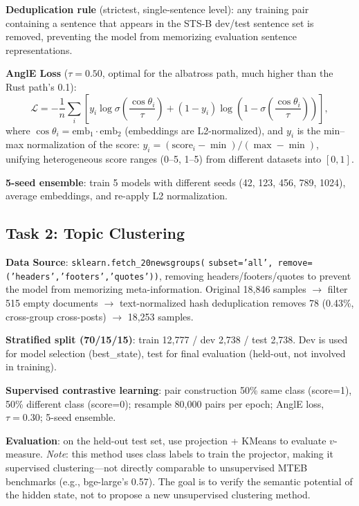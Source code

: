 \documentclass[11pt]{article}
\begin{document}
\textbf{Deduplication rule} (strictest, single-sentence level): any training
pair containing a sentence that appears in the STS-B dev/test sentence set is
removed, preventing the model from memorizing evaluation sentence
representations.

\textbf{AnglE Loss} ($\tau=0.50$, optimal for the albatross path, much higher
than the Rust path's 0.1):
\begin{equation}
\mathcal{L} = -\frac{1}{n} \sum_i \left[ y_i \log
\sigma\!\left(\frac{\cos\theta_i}{\tau}\right) + (1-y_i) \log\left(1 -
\sigma\!\left(\frac{\cos\theta_i}{\tau}\right)\right) \right],
\end{equation}
where $\cos\theta_i = \text{emb}_1 \cdot \text{emb}_2$ (embeddings are
L2-normalized), and $y_i$ is the min--max normalization of the score:
$y_i = (\text{score}_i - \min) / (\max - \min)$, unifying heterogeneous score
ranges (0--5, 1--5) from different datasets into $[0,1]$.

\textbf{5-seed ensemble}: train 5 models with different seeds (42, 123, 456,
789, 1024), average embeddings, and re-apply L2 normalization.

\subsection{Task 2: Topic Clustering}

\textbf{Data Source}:
\texttt{sklearn.fetch\_20newsgroups(}%
\allowbreak\texttt{subset='all', remove=('headers','footers','quotes'))},
removing headers/footers/quotes to prevent the model from memorizing
meta-information. Original 18,846 samples $\to$ filter 515 empty documents
$\to$ text-normalized hash deduplication removes 78 (0.43\%, cross-group
cross-posts) $\to$ 18,253 samples.

\textbf{Stratified split (70/15/15)}: train 12,777 / dev 2,738 / test 2,738.
Dev is used for model selection (best\_state), test for final evaluation
(held-out, not involved in training).

\textbf{Supervised contrastive learning}: pair construction 50\% same class
(score=1), 50\% different class (score=0); resample 80,000 pairs per epoch;
AnglE loss, $\tau=0.30$; 5-seed ensemble.

\textbf{Evaluation}: on the held-out test set, use projection + KMeans to
evaluate $v$-measure. \emph{Note}: this method uses class labels to train
the projector, making it supervised clustering---not directly comparable to
unsupervised MTEB benchmarks (e.g., bge-large's 0.57). The goal is to verify
the semantic potential of the hidden state, not to propose a new
unsupervised clustering method.
\end{document}
